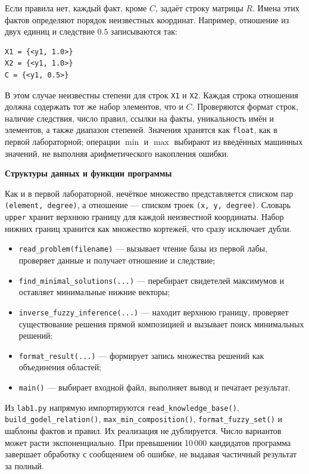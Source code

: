 \documentclass[14pt,a4paper]{extarticle}
\newcommand{\reportheading}[1]{\par\vspace{0.8\baselineskip}\noindent\textbf{#1}\par\nobreak\vspace{0.35\baselineskip}\nobreak}
\begin{document}
Если правила нет, каждый факт, кроме $C$, задаёт строку матрицы $R$. Имена этих фактов определяют порядок неизвестных координат. Например, отношение из двух единиц и следствие $0.5$ записываются так:
\begin{Verbatim}[fontsize=\small,frame=single,breaklines=true]
X1 = {<y1, 1.0>}
X2 = {<y1, 1.0>}
C = {<y1, 0.5>}
\end{Verbatim}
В этом случае неизвестны степени для строк \texttt{X1} и \texttt{X2}. Каждая строка отношения должна содержать тот же набор элементов, что и $C$. Проверяются формат строк, наличие следствия, число правил, ссылки на факты, уникальность имён и элементов, а также диапазон степеней. Значения хранятся как \texttt{float}, как в первой лабораторной; операции $\min$ и $\max$ выбирают из введённых машинных значений, не выполняя арифметического накопления ошибки.

\reportheading{Структуры данных и функции программы}
Как и в первой лабораторной, нечёткое множество представляется списком пар \texttt{(element, degree)}, а отношение --- списком троек \texttt{(x, y, degree)}. Словарь \texttt{upper} хранит верхнюю границу для каждой неизвестной координаты. Набор нижних границ хранится как множество кортежей, что сразу исключает дубли.

\begin{itemize}
\item \texttt{read\_problem(filename)} --- вызывает чтение базы из первой лабы, проверяет данные и получает отношение и следствие;
\item \texttt{find\_minimal\_solutions(...)} --- перебирает свидетелей максимумов и оставляет минимальные нижние векторы;
\item \texttt{inverse\_fuzzy\_inference(...)} --- находит верхнюю границу, проверяет существование решения прямой композицией и вызывает поиск минимальных решений;
\item \texttt{format\_result(...)} --- формирует запись множества решений как объединения областей;
\item \texttt{main()} --- выбирает входной файл, выполняет вывод и печатает результат.
\end{itemize}

Из \texttt{lab1.py} напрямую импортируются \texttt{read\_knowledge\_base()}, \texttt{build\_godel\_relation()}, \texttt{max\_min\_composition()}, \texttt{format\_fuzzy\_set()} и шаблоны фактов и правил. Их реализация не дублируется. Число вариантов может расти экспоненциально. При превышении 10\,000 кандидатов программа завершает обработку с сообщением об ошибке, не выдавая частичный результат за полный.
\end{document}
